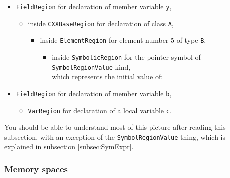 \documentclass[a4paper,12pt]{article}
\newenvironment{nobr}{\begin{minipage}{\textwidth}\setlength\parskip{1em}
}{\end{minipage}\ignorespacesafterend}
\begin{document}
\begin{nobr}
\begin{itemize}
\item[]\lstinline|FieldRegion| for declaration of member variable \lstinline|y|,
\begin{itemize}
\item[]inside \lstinline|CXXBaseRegion| for declaration of class \lstinline|A|,
\begin{itemize}
\item[]inside \lstinline|ElementRegion| for element number $5$ of type \lstinline|B|,
\begin{itemize}
\item[]inside \lstinline|SymbolicRegion| for the pointer symbol of \lstinline|SymbolRegionValue| kind,\\
which represents the initial value of:
\end{itemize}
\end{itemize}
\end{itemize}
\end{itemize}

\begin{itemize}
\item[]\lstinline|FieldRegion| for declaration of member variable \lstinline|b|,
\begin{itemize}
\item[]\lstinline|VarRegion| for declaration of a local variable \lstinline|c|.
\end{itemize}
\end{itemize}
\end{nobr}

You should be able to understand most of this picture after reading this subsection, with an exception of the \lstinline|SymbolRegionValue| thing, which is explained in subsection \ref{subsec:SymExpr}.

\subsubsection{Memory spaces}
\end{document}
